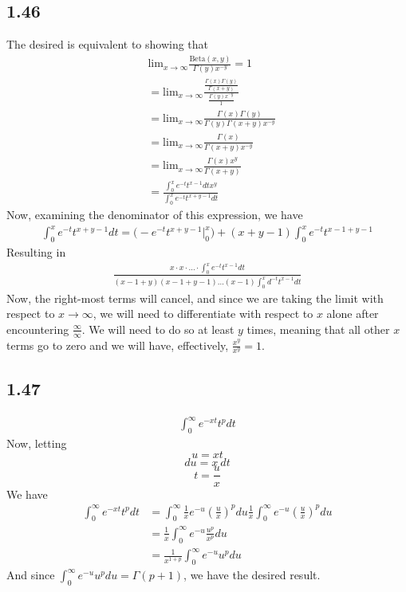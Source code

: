 \documentclass[letterpaper,12pt]{article}
\theoremstyle{definition}
\begin{document}
\subsection*{1.46}
The desired is equivalent to showing that
\begin{align*}
    &\text{lim}_{x\rightarrow \infty} \frac{\text{Beta} (x,y)}{\Gamma(y) x^{-y}} =1
    \\&= \text{lim}_{x\rightarrow \infty} \frac{\frac{\Gamma(x)\Gamma(y) }{\Gamma(x+y)}}{\frac{\Gamma(y)x^{-y}}{1}} 
    \\&= \text{lim}_{x\rightarrow \infty} \frac{\Gamma(x)\Gamma(y) }{\Gamma(y) \Gamma(x+y) x^{-y}} 
    \\&= \text{lim}_{x\rightarrow \infty} \frac{\Gamma(x) }{ \Gamma(x+y) x^{-y}} 
    \\&= \text{lim}_{x\rightarrow \infty} \frac{\Gamma(x) x^{y}}{ \Gamma(x+y) } 
    \\&= \frac{\int^{x}_{0}e^{-t} t^{x-1} dt x^y}{\int^{x}_{0}e^{-t} t^{x+y-1} dt} 
\end{align*}
Now, examining the denominator of this expression, we have
\begin{align*}
    \int^{x}_{0}e^{-t} t^{x+y-1} dt = \Big( -e^{-t}t^{x+y-1} \Big|^{x}_{0} \Big) + (x+y-1) \int^{x}_{0}e^{-t} t^{x-1 + y-1}
\end{align*}
Resulting in 
\begin{align*}
    \frac{x\cdot x \cdot \dots \cdot \int^{x}_{0}e^{-t} t^{x-1}dt}{(x-1+y)(x-1+y-1)\dots(x-1) \int^{x}_{0}d^{-t}t^{x-1}dt}
\end{align*}
Now, the right-most terms will cancel, and since we are taking the limit with respect to $x \rightarrow \infty$, we will need to differentiate with respect to $x$ alone after encountering $\frac{\infty}{\infty}$. We will need to do so at least $y$ times, meaning that all other $x$ terms go to zero and we will have, effectively, $\frac{x^y}{x^y} = 1$. 

\subsection*{1.47}
\begin{align*}
    \int^{\infty}_{0} e^{-xt} t^p dt
\end{align*}
Now, letting 
\[ u = xt \]
\[ du = x~ dt \]
\[ t = \frac{u}{x} \]
We have
\begin{align*}
    \int^{\infty}_{0} e^{-xt} t^p dt &=\int^{\infty}_{0} \frac{1}{x}e^{-u} (\frac{u}{x})^p du
    \frac{1}{x}\int^{\infty}_{0} e^{-u} (\frac{u}{x})^p du
    \\&=\frac{1}{x}\int^{\infty}_{0} e^{-u} \frac{u^p}{x^p} du
    \\&=\frac{1}{x^{1+p}}\int^{\infty}_{0} e^{-u} u^p du
\end{align*}
And since $\int^{\infty}_{0} e^{-u} u^p du = \Gamma(p+1) $, we have the desired result.
\end{document}
